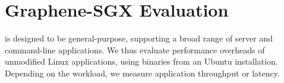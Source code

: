 \section{Graphene-SGX Evaluation}
\label{sec:eval:sgx}


\label{sec:eval:perf}


\graphenesgx{} is designed to be general-purpose, supporting a broad range of
server and command-line applications. 
We thus evaluate performance overheads of unmodified Linux applications, using binaries 
from an Ubuntu installation.
Depending on the workload, we measure application throughput or latency.


